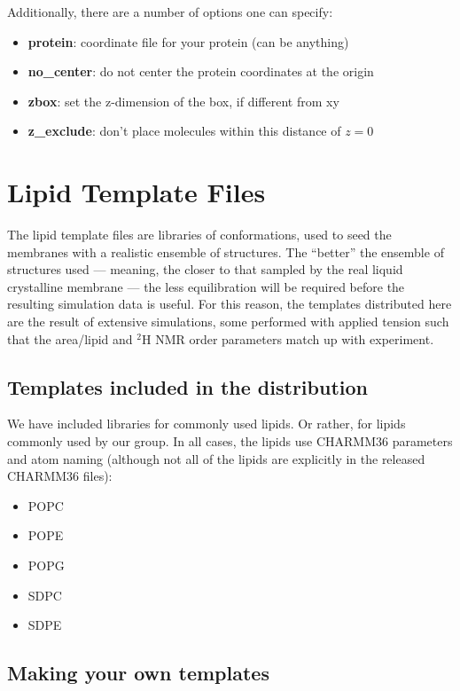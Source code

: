 \documentclass[12pt]{article}
\begin{document}
Additionally, there are a number of options one can specify:
\begin{itemize}
    \item {\bf protein}: coordinate file for your protein (can be anything)
    \item {\bf no\_center}: do not center the protein coordinates at the origin
    \item {\bf zbox}: set the z-dimension of the box, if different from xy
    \item {\bf z\_exclude}: don't place molecules within this distance of $z=0$
\end{itemize}

\section{Lipid Template Files}
\label{s:library}

The lipid template files are libraries of conformations, used to seed the
membranes with a realistic ensemble of structures.  The ``better'' the
ensemble of structures used --- meaning, the closer to that sampled by the
real liquid crystalline membrane --- the less equilibration will be required
before the resulting simulation data is useful.  For this reason, the
templates distributed here are the result of extensive simulations, some
performed with applied tension such that the area/lipid and $^2$H NMR order
parameters match up with experiment.

\subsection{Templates included in the distribution}
\label{ss:included}

We have included libraries for commonly used lipids.  Or rather, for lipids
commonly used by our group.  In all cases, the lipids use CHARMM36 parameters
and atom naming (although not all of the lipids are explicitly in the
released CHARMM36 files):

\begin{itemize}
    \item POPC
    \item POPE
    \item POPG
    \item SDPC
    \item SDPE
\end{itemize}

\subsection{Making your own templates}
\label{ss:diy}
\end{document}
